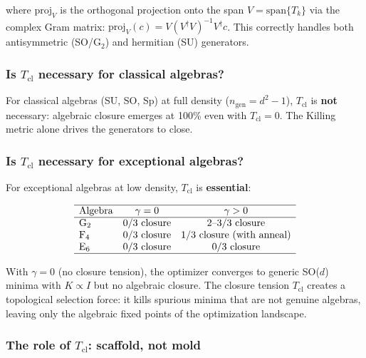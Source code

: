 where $\mathrm{proj}_V$ is the orthogonal projection onto the span $V = \mathrm{span}\{T_k\}$ via the complex Gram matrix: $\mathrm{proj}_V(c) = V (V^\dagger V)^{-1} V^\dagger c$. This correctly handles both antisymmetric (SO/G$_2$) and hermitian (SU) generators.

\subsubsection{Is $T_{\mathrm{cl}}$ necessary for classical algebras?}

For classical algebras (SU, SO, Sp) at full density ($n_{\mathrm{gen}} = d^2 - 1$), $T_{\mathrm{cl}}$ is \textbf{not} necessary: algebraic closure emerges at 100\% even with $T_{\mathrm{cl}} = 0$. The Killing metric alone drives the generators to close.

\subsubsection{Is $T_{\mathrm{cl}}$ necessary for exceptional algebras?}

For exceptional algebras at low density, $T_{\mathrm{cl}}$ is \textbf{essential}:

\begin{equation}
\begin{array}{lcc}
\hline
\text{Algebra} & \gamma = 0 & \gamma > 0 \\
\hline
\text{G}_2 & 0/3 \text{ closure} & 2\text{--}3/3 \text{ closure} \\
\text{F}_4 & 0/3 \text{ closure} & 1/3 \text{ closure (with anneal)} \\
\text{E}_6 & 0/3 \text{ closure} & 0/3 \text{ closure} \\
\hline
\end{array}
\end{equation}

With $\gamma = 0$ (no closure tension), the optimizer converges to generic SO($d$) minima with $K \propto I$ but no algebraic closure. The closure tension $T_{\mathrm{cl}}$ creates a topological selection force: it kills spurious minima that are not genuine algebras, leaving only the algebraic fixed points of the optimization landscape.

\subsubsection{The role of $T_{\mathrm{cl}}$: scaffold, not mold}


